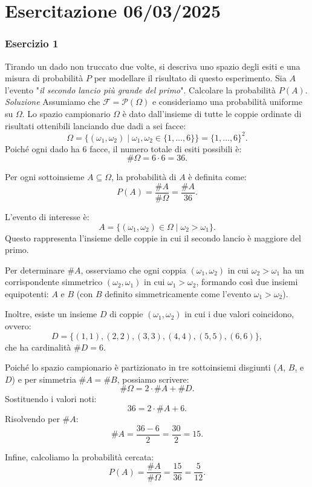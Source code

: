 \section{Esercitazione 06/03/2025}
\subsubsection{Esercizio 1}
Tirando un dado non truccato due volte, si descriva uno spazio degli esiti e una misura di probabilità $P$ per modellare il risultato di questo esperimento. Sia $A$ l’evento "\textit{il secondo lancio più grande del primo}". Calcolare la probabilità $P(A)$.
\\

\textit{Soluzione} \quad Assumiamo che $\mathcal{F} = \mathcal{P}(\Omega)$
e consideriamo una probabilità uniforme su $\Omega$. 
Lo spazio campionario $\Omega$ è dato dall'insieme di tutte le coppie ordinate di risultati ottenibili lanciando due dadi a sei facce:
\[
\Omega = \{(\omega_1, \omega_2) \mid \omega_1,\omega_2 \in \{1,\dots,6\}\} = \{1,\dots,6\}^2.
\]
Poiché ogni dado ha 6 facce, il numero totale di esiti possibili è:
\[
\#\Omega = 6 \cdot 6 = 36.
\]

Per ogni sottoinsieme $A \subseteq \Omega$, la probabilità di $A$ è definita come:
\[
P(A) = \frac{\#A}{\#\Omega} = \frac{\#A}{36}.
\]


L'evento di interesse è:
\[
A = \{(\omega_1,\omega_2) \in \Omega \mid \omega_2 > \omega_1\}.
\]
Questo rappresenta l'insieme delle coppie in cui il secondo lancio è maggiore del primo.

Per determinare $\#A$, osserviamo che ogni coppia $(\omega_1, \omega_2)$ in cui $\omega_2 > \omega_1$ ha un corrispondente simmetrico $(\omega_2, \omega_1)$ in cui $\omega_1 > \omega_2$, formando così due insiemi equipotenti: $A$ e $B$ (con $B$ definito simmetricamente come l'evento $\omega_1 > \omega_2$).

Inoltre, esiste un insieme $D$ di coppie $(\omega_1,\omega_2)$ in cui i due valori coincidono, ovvero:
\[
D = \{(1,1), (2,2), (3,3), (4,4), (5,5), (6,6)\},
\]
che ha cardinalità $\#D = 6$.

Poiché lo spazio campionario è partizionato in tre sottoinsiemi disgiunti ($A$, $B$, e $D$) e per simmetria $\#A = \#B$, possiamo scrivere:
\[
\#\Omega = 2\cdot \#A + \#D.
\]
Sostituendo i valori noti:
\[
36 = 2 \cdot \#A + 6.
\]
Risolvendo per $\#A$:
\[
\#A = \frac{36 - 6}{2} = \frac{30}{2} = 15.
\]


Infine, calcoliamo la probabilità cercata:
\[
P(A) = \frac{\#A}{\#\Omega} = \frac{15}{36} = \frac{5}{12}.
\]


